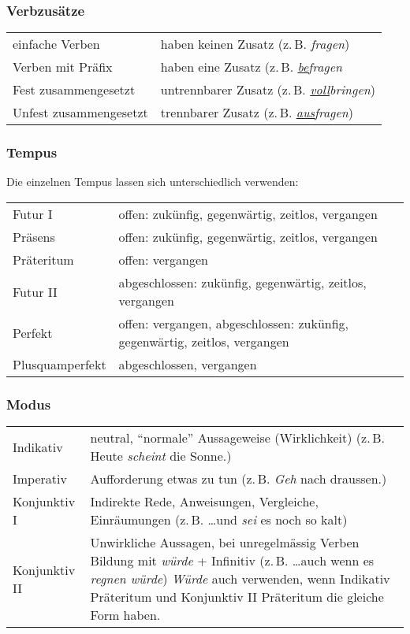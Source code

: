 \subsubsection{Verbzusätze}
\settowidth{\MyLenA}{Unfest zusammengesetzt~~}
\begin{tabular}{@{}p{\the\MyLenA}%
				@{}p{\linewidth-\the\MyLenA}}
	einfache Verben & haben keinen Zusatz (z.\,B. \textit{fragen})\\
	Verben mit Präfix & haben eine Zusatz (z.\,B. \textit{\underline{be}fragen}\\
	Fest zusammengesetzt & untrennbarer Zusatz (z.\,B. \textit{\underline{voll}bringen})\\
	Unfest zusammengesetzt & trennbarer Zusatz (z.\,B. \textit{\underline{aus}fragen})\\
\end{tabular}

\subsubsection{Tempus}
Die einzelnen Tempus lassen sich unterschiedlich verwenden:
\settowidth{\MyLenA}{Plusquamperfekt~~}
\begin{tabular}{@{}p{\the\MyLenA}%
				@{}p{\linewidth-\the\MyLenA}}
	Futur I & offen: zukünfig, gegenwärtig, zeitlos, vergangen\\
	Präsens & offen: zukünfig, gegenwärtig, zeitlos, vergangen\\
	Präteritum & offen: vergangen\\
	Futur II & abgeschlossen: zukünfig, gegenwärtig, zeitlos, vergangen\\
	Perfekt & offen: vergangen, abgeschlossen: zukünfig, gegenwärtig, zeitlos, vergangen\\
	Plusquamperfekt & abgeschlossen, vergangen\\
\end{tabular}

\subsubsection{Modus}
\settowidth{\MyLenA}{Konjunktiv II~~}
\begin{tabular}{@{}p{\the\MyLenA}%
				@{}p{\linewidth-\the\MyLenA}}
	Indikativ & neutral, \enquote{normale} Aussageweise (Wirklichkeit) (z.\,B. Heute \textit{scheint} die Sonne.)\\
	Imperativ & Aufforderung etwas zu tun (z.\,B. \textit{Geh} nach draussen.)\\
	Konjunktiv I & Indirekte Rede, Anweisungen, Vergleiche, Einräumungen (z.\,B. \dots und \textit{sei} es noch so kalt)\\
	Konjunktiv II & Unwirkliche Aussagen, bei unregelmässig Verben Bildung mit \textit{würde} + Infinitiv (z.\,B. \dots auch wenn es \textit{regnen würde}) 
	\textit{Würde} auch verwenden, wenn Indikativ Präteritum und Konjunktiv II Präteritum die gleiche Form haben.\\
\end{tabular}

